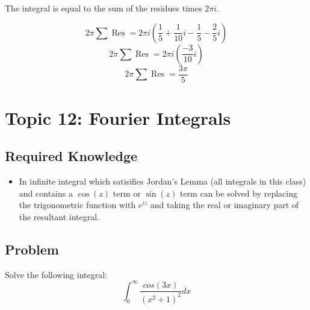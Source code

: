 \documentclass[12pt]{article}
\newcommand{\Res}{\operatorname{Res}}
\begin{document}
The integral is equal to the sum of the residues times $2\pi i$.

\begin{equation}
	2\pi\sum\Res=2\pi i(\frac{1}{5}+\frac{1}{10}i-\frac{1}{5}-\frac{2}{5}i)
\end{equation}
\begin{equation}
	2\pi\sum\Res=2\pi i(\frac{-3}{10}i)
\end{equation}
\begin{equation}
	2\pi\sum\Res=\frac{3\pi}{5}
\end{equation}
\section{Topic 12: Fourier Integrals}
\subsection{Required Knowledge}
\begin{itemize}
    \item In infinite integral which satisifies Jordan's Lemma (all integrals in this class) and contains a $\cos(z)$ term or $\sin(z)$ term can be solved by replacing the trigonometric function with $e^{iz}$ and taking the real or imaginary part of the resultant integral.
\end{itemize}
\subsection{Problem}
Solve the following integral:
\begin{equation}
	\int_0^{\infty}\frac{cos(3x)}{(x^2+1)^2}dx
\end{equation}
\end{document}
